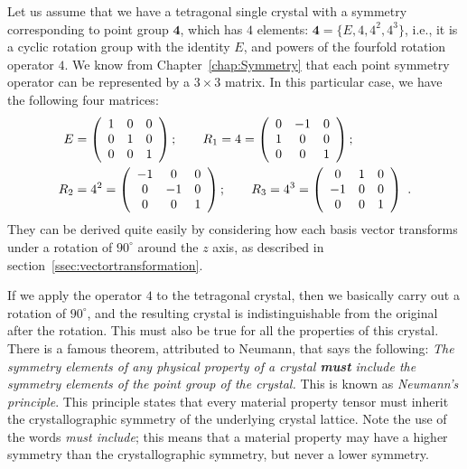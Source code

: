 Let us assume that we have a tetragonal single crystal with a symmetry corresponding to point group $\textbf{4}$, which has $4$ elements: $\textbf{4} = \{E,4,4^2,4^3\}$, i.e., it is a cyclic rotation group with the identity $E$, and powers of the fourfold rotation operator $4$. We know from Chapter~\ref{chap:Symmetry} that each point symmetry operator can be represented by a $3\times 3$ matrix.  In this particular case, we have the following four matrices:
\begin{align}
E &= \left(\begin{array}{ccc} 1 & 0 & 0 \\ 0 & 1 & 0 \\ 0 & 0 & 1\end{array}\right); \qquad R_1 = 4 = \left(\begin{array}{ccc} 0 & -1 & 0 \\ 1 & 0 & 0 \\ 0 & 0 & 1\end{array}\right);\nonumber\\
R_2 &= 4^2= \left(\begin{array}{ccc} -1 & 0 & 0 \\ 0 & -1 & 0 \\ 0 & 0 & 1\end{array}\right); \qquad R_3 = 4^3 = \left(\begin{array}{ccc} 0 & 1 & 0 \\ -1 & 0 & 0 \\ 0 & 0 & 1\end{array}\right)\ .
\end{align}
They can be derived quite easily by considering how each basis vector transforms under a rotation of $90^{\circ}$ around the $z$ axis, as described in section~\ref{ssec:vectortransformation}.

If we apply the operator $4$ to the tetragonal crystal, then we basically carry out a rotation of $90^{\circ}$, and the resulting crystal is indistinguishable from the original after the rotation.  This must also be true for all the properties of this crystal.  There is a famous theorem, attributed to Neumann, that says the following:  \textit{The symmetry elements of any physical property of a crystal \textbf{must} include the symmetry elements of the point group of the crystal.}  This is known as \textit{Neumann's principle}.   This principle states that every material property tensor must inherit the crystallographic symmetry of the underlying crystal lattice.  Note the use of the words \textit{must include}; this means that a material property may have a higher symmetry than the crystallographic symmetry, but never a lower symmetry.

